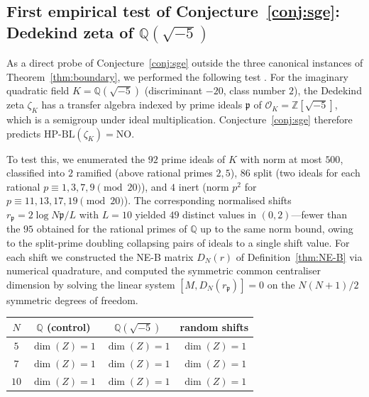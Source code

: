 \documentclass[11pt]{article}
\theoremstyle{definition}
\theoremstyle{remark}
\newcommand{\HBL}{\mathrm{HP\text{-}BL}}
\begin{document}
\subsection[First empirical test of Conjecture: Dedekind zeta of Q(sqrt(-5))]{First empirical test of Conjecture~\ref{conj:sge}:
Dedekind zeta of \texorpdfstring{$\mathbb{Q}(\sqrt{-5})$}{Q(sqrt(-5))}}
\label{sec:sge-dedekind-test}

As a direct probe of Conjecture~\ref{conj:sge} outside the three
canonical instances of Theorem~\ref{thm:boundary}, we performed the
following test \cite{DedekindNEBTest}. For the imaginary quadratic
field $K = \mathbb{Q}(\sqrt{-5})$ (discriminant $-20$, class number
$2$), the Dedekind zeta $\zeta_K$ has a transfer algebra indexed by
prime ideals $\mathfrak{p}$ of $\mathcal{O}_K = \mathbb{Z}[\sqrt{-5}]$,
which is a semigroup under ideal multiplication. Conjecture~\ref{conj:sge}
therefore predicts $\HBL(\zeta_K) = \mathrm{NO}$.

To test this, we enumerated the $92$ prime ideals of $K$ with norm
at most $500$, classified into $2$ ramified (above rational primes
$2, 5$), $86$ split (two ideals for each rational $p \equiv 1, 3, 7,
9 \pmod{20}$), and $4$ inert (norm $p^2$ for $p \equiv 11, 13, 17,
19 \pmod{20}$). The corresponding normalised shifts $r_\mathfrak{p}
= 2\log N\mathfrak{p}/L$ with $L = 10$ yielded $49$ distinct values
in $(0, 2)$---fewer than the $95$ obtained for the rational primes
of $\mathbb{Q}$ up to the same norm bound, owing to the split-prime
doubling collapsing pairs of ideals to a single shift value. For each
shift we constructed the NE-B matrix $D_N(r)$ of
Definition~\ref{thm:NE-B} via numerical quadrature, and computed
the symmetric common centraliser dimension by solving the linear
system $[M, D_N(r_\mathfrak{p})] = 0$ on the $N(N+1)/2$ symmetric
degrees of freedom.

\begin{center}
\begin{tabular}{@{}c c c c@{}}
\toprule
$N$ & $\mathbb{Q}$ (control) & $\mathbb{Q}(\sqrt{-5})$ & random shifts \\
\midrule
$5$ & $\dim(Z) = 1$ & $\dim(Z) = 1$ & $\dim(Z) = 1$ \\
$7$ & $\dim(Z) = 1$ & $\dim(Z) = 1$ & $\dim(Z) = 1$ \\
$10$ & $\dim(Z) = 1$ & $\dim(Z) = 1$ & $\dim(Z) = 1$ \\
\bottomrule
\end{tabular}
\end{center}
\end{document}
